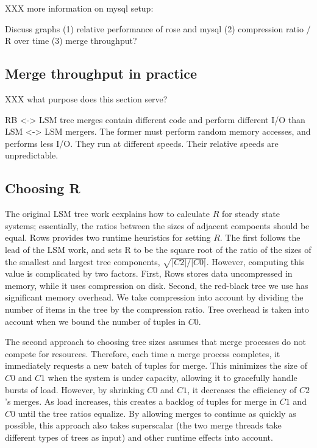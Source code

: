 \documentclass{sig-alternate-sigmod08}
\newcommand{\rows}{Rows\xspace}
\begin{document}
XXX more information on mysql setup:

Discuss graphs (1) relative performance of rose and mysql (2) compression ratio / R over time (3) merge throughput?

\subsection{Merge throughput in practice}

XXX what purpose does this section serve?

RB <-> LSM tree merges contain different code and perform different
I/O than LSM <-> LSM mergers.  The former must perform random memory
accesses, and performs less I/O.  They run at different speeds.  Their
relative speeds are unpredictable.

\subsection{Choosing R}

The original LSM tree work eexplains how to calculate $R$ for steady
state systems; essentially, the ratios between the sizes of adjacent
compoents should be equal.  \rows provides two runtime heuristics for
setting $R$.  The first follows the lead of the LSM work, and sets R
to be the square root of the ratio of the sizes of the smallest and
largest tree components, $\sqrt{|C2|/|C0|}$.  However, computing this
value is complicated by two factors.  First, \rows stores data
uncompressed in memory, while it uses compression on disk.  Second,
the red-black tree we use has significant memory overhead.  We take
compression into account by dividing the number of items in the tree
by the compression ratio.  Tree overhead is taken into account when we
bound the number of tuples in $C0$.

The second approach to choosing tree sizes assumes that merge
processes do not compete for resources.  Therefore, each time a merge
process completes, it immediately requests a new batch of tuples for
merge.  This minimizes the size of $C0$ and $C1$ when the system is
under capacity, allowing it to gracefully handle bursts of load.
However, by shrinking $C0$ and $C1$, it decreases the efficiency of
$C2$'s merges.  As load increases, this creates a backlog of tuples
for merge in $C1$ and $C0$ until the tree ratios equalize.  By
allowing merges to continue as quickly as possible, this approach also
takes superscalar (the two merge threads take different types of trees
as input) and other runtime effects into account.
\end{document}
